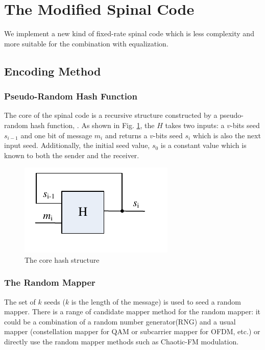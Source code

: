 \documentclass[conference]{IEEEtran}
\begin{document}
\section{The Modified Spinal Code}
We implement a new kind of fixed-rate spinal code which is less complexity and more suitable for the combination with equalization.
\subsection{Encoding Method}
\subsubsection{Pseudo-Random Hash Function}
The core of the spinal code is a recursive structure constructed by a pseudo-random hash function, . As shown in Fig. \ref{fig_hash}, the $H$ takes two inputs: a $v$-bits seed $s_{i-1}$ and one bit of message $m_i$ and returns a $v$-bits seed $s_i$ which is also the next input seed. Additionally, the initial seed value, $s_0$ is a constant value which is known to both the sender and the receiver.
\begin{figure}[!t]
\centering
\includegraphics[width=2 in]{encoderCore.pdf}
\caption{The core hash structure}
\label{fig_hash}
\end{figure}
\subsubsection{The Random Mapper}

The set of $k$ seeds ($k$ is the length of the message) is used to seed a random mapper. There is a range of candidate  mapper method for the random mapper: it could be a combination of  a random number generator(RNG) and a usual mapper (constellation mapper for QAM or subcarrier mapper for OFDM, etc.) or directly use the random mapper methods such as Chaotic-FM modulation.
\end{document}
